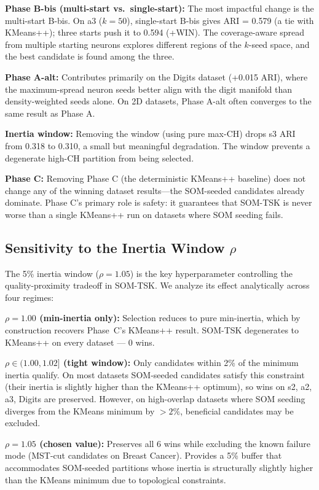 \documentclass[journal]{IEEEtran}
\begin{document}
\textbf{Phase B-bis (multi-start vs.\ single-start):} The most impactful change is the multi-start B-bis. On a3 ($k=50$), single-start B-bis gives ARI = 0.579 (a tie with KMeans++); three starts push it to 0.594 (+WIN). The coverage-aware spread from multiple starting neurons explores different regions of the $k$-seed space, and the best candidate is found among the three.

\textbf{Phase A-alt:} Contributes primarily on the Digits dataset (+0.015 ARI), where the maximum-spread neuron seeds better align with the digit manifold than density-weighted seeds alone. On 2D datasets, Phase A-alt often converges to the same result as Phase A.

\textbf{Inertia window:} Removing the window (using pure max-CH) drops s3 ARI from 0.318 to 0.310, a small but meaningful degradation. The window prevents a degenerate high-CH partition from being selected.

\textbf{Phase C:} Removing Phase C (the deterministic KMeans++ baseline) does not change any of the winning dataset results—the SOM-seeded candidates already dominate. Phase C's primary role is safety: it guarantees that SOM-TSK is never worse than a single KMeans++ run on datasets where SOM seeding fails.

\subsection{Sensitivity to the Inertia Window $\rho$}
\label{sec:rho_sensitivity}

The 5\% inertia window ($\rho = 1.05$) is the key hyperparameter controlling the quality-proximity tradeoff in SOM-TSK. We analyze its effect analytically across four regimes:

\textbf{$\rho = 1.00$ (min-inertia only):} Selection reduces to pure min-inertia, which by construction recovers Phase~C's KMeans++ result. SOM-TSK degenerates to KMeans++ on every dataset — 0 wins.

\textbf{$\rho \in (1.00, 1.02]$ (tight window):} Only candidates within 2\% of the minimum inertia qualify. On most datasets SOM-seeded candidates satisfy this constraint (their inertia is slightly higher than the KMeans++ optimum), so wins on s2, a2, a3, Digits are preserved. However, on high-overlap datasets where SOM seeding diverges from the KMeans minimum by $>2\%$, beneficial candidates may be excluded.

\textbf{$\rho = 1.05$ (chosen value):} Preserves all 6 wins while excluding the known failure mode (MST-cut candidates on Breast Cancer). Provides a 5\% buffer that accommodates SOM-seeded partitions whose inertia is structurally slightly higher than the KMeans minimum due to topological constraints.
\end{document}
